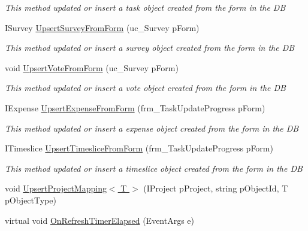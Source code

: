 \begin{DoxyCompactItemize}
\begin{DoxyCompactList}\small\item\em This method updated or insert a task object created from the form in the DB \end{DoxyCompactList}\item 
I\+Survey \hyperlink{class_plex_byte_1_1_mo_cap_1_1_managers_1_1_object_manager_a9f83ebe6abc69b0b35e6e9faf1bd0340}{Upsert\+Survey\+From\+Form} (uc\+\_\+\+Survey p\+Form)
\begin{DoxyCompactList}\small\item\em This method updated or insert a survey object created from the form in the DB \end{DoxyCompactList}\item 
void \hyperlink{class_plex_byte_1_1_mo_cap_1_1_managers_1_1_object_manager_a9ed31b06f82fcbf67f006739f6738864}{Upsert\+Vote\+From\+Form} (uc\+\_\+\+Survey p\+Form)
\begin{DoxyCompactList}\small\item\em This method updated or insert a vote object created from the form in the DB \end{DoxyCompactList}\item 
I\+Expense \hyperlink{class_plex_byte_1_1_mo_cap_1_1_managers_1_1_object_manager_a04ac7191b57ed83d1325ce7ae317ab88}{Upsert\+Expense\+From\+Form} (frm\+\_\+\+Task\+Update\+Progress p\+Form)
\begin{DoxyCompactList}\small\item\em This method updated or insert a expense object created from the form in the DB \end{DoxyCompactList}\item 
I\+Timeslice \hyperlink{class_plex_byte_1_1_mo_cap_1_1_managers_1_1_object_manager_a4ffd5fd62836ade783d8d28424d8caa4}{Upsert\+Timeslice\+From\+Form} (frm\+\_\+\+Task\+Update\+Progress p\+Form)
\begin{DoxyCompactList}\small\item\em This method updated or insert a timeslice object created from the form in the DB \end{DoxyCompactList}\item 
void \hyperlink{class_plex_byte_1_1_mo_cap_1_1_managers_1_1_object_manager_a421d47196ef67a3afb9a3c7ba80e83ac}{Upsert\+Project\+Mapping$<$ T $>$} (I\+Project p\+Project, string p\+Object\+Id, T p\+Object\+Type)
\item 
virtual void \hyperlink{class_plex_byte_1_1_mo_cap_1_1_managers_1_1_object_manager_a5bc64a054fde379d01f1c1c6ab4ba947}{On\+Refresh\+Timer\+Elapsed} (Event\+Args e)

\end{DoxyCompactItemize}
